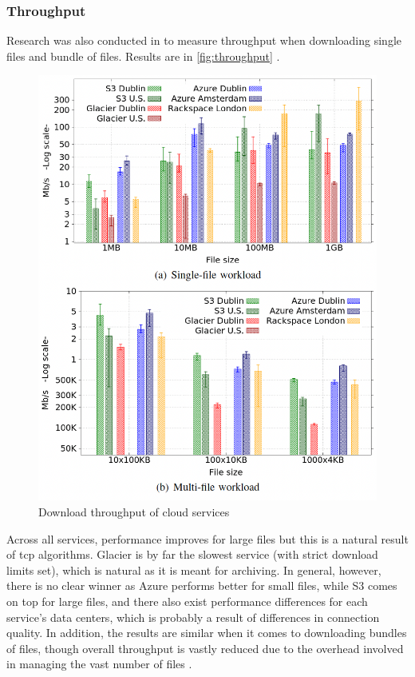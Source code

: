 \subsubsection{Throughput}
Research was also conducted in \cite{s3vsblob_performance} to measure throughput when downloading single files and bundle of files. Results are in \autoref{fig:throughput} .
\begin{figure} [h]
    \centering
    \includegraphics[scale=0.5]{images/throughput}
    \caption{\label{fig:throughput}Download throughput of cloud services}
\end{figure}

Across all services, performance improves for large files but this is a natural result of \ac{tcp} algorithms. Glacier is by far the slowest service (with strict download limits set), which is natural as it is meant for archiving. In general, however, there is no clear winner as Azure performs better for small files, while S3 comes on top for large files, and there also exist performance differences for each service's data centers, which is probably a result of differences in connection quality. In addition,  the results are similar when it comes to downloading bundles of files, though overall throughput is vastly reduced due to the overhead involved in managing the vast number of files .

